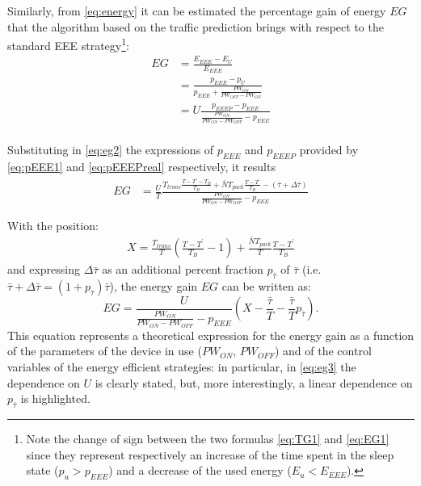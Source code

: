 \documentclass[journal,10pt,twoside,final]{IEEEtran}
\begin{document}
Similarly, from \eqref{eq:energy} it can be estimated the percentage gain of energy $EG$ that the algorithm based on the traffic prediction brings with respect to the standard EEE strategy\footnote{Note the change of sign between the two formulas \eqref{eq:TG1} and \eqref{eq:EG1} since they represent respectively an increase of the time spent in the sleep state ($p_u>p_{EEE}$) and a decrease of the used energy ($E_u<E_{EEE}$).}:
\begin{align}
EG &= \frac{E_{EEE} - E_U}{E_{EEE}} \label{eq:EG1}\\
   &= \frac{p_{EEE} - p_U}{p_{EEE} + \frac{PW_{ON}}{PW_{OFF} - PW_{ON}}}\\
   &= U \frac{p_{EEEP} - p_{EEE}}{\frac{PW_{ON}}{PW_{ON} - PW_{OFF}} - p_{EEE}}\\
   \label{eq:eg2}
\end{align}

Substituting in \eqref{eq:eg2} the expressions of $p_{EEE}$ and $p_{EEEP}$ provided by \eqref{eq:pEEE1} and \eqref{eq:pEEEPreal} respectively, it results
\begin{align}
EG &= \frac{U}{T} \frac{T_{trans} \frac{T - T^\prime - T_B}{T_B} + \bar{N}T_{pack} \frac{T - T^\prime}{T_B} - (\bar{\tau} + \Delta \bar{\tau})}{\frac{PW_{ON}} {PW_{ON} - PW_{OFF}} - p_{EEE}}
   \label{eq:egfinal}
\end{align}

With the position:
\begin{equation}
\begin{array}{l} 
	X=\frac{T_{trans}}{T} \left(\frac{T - T^\prime}{T_B}-1\right) + \frac{\bar{N}T_{pack}}{T} \frac{T - T^\prime}{T_B} \end{array}
\nonumber
\end{equation}
and expressing $\Delta \bar{\tau}$ as an additional percent fraction $p_{\bar{\tau}}$ of $\bar{\tau}$ (i.e. $\bar{\tau}+\Delta \bar{\tau}=(1+p_{\bar{\tau}})\bar{\tau}$), the energy gain $EG$ can be written as:
\begin{equation}
EG= \frac{U}{\frac{PW_{ON}} {PW_{ON} - PW_{OFF}} - p_{EEE}}\left(X - \frac{\bar{\tau}}{T} - \frac{\bar{\tau}}{T}p_{\bar{\tau}}\right).
\label{eq:eg3}
\end{equation}
This equation represents a theoretical expression for the energy gain as a function of the parameters of the device in use ($PW_{ON}$, $PW_{OFF}$) and of the control variables of the energy efficient strategies: in particular, in \eqref{eq:eg3} the dependence on $U$ is clearly stated, but, more interestingly, a linear dependence on $p_{\bar{\tau}}$ is highlighted.
\end{document}
